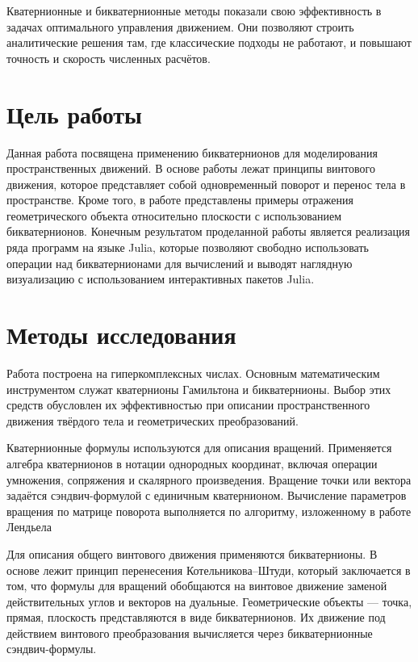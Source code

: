 Кватернионные и бикватернионные методы показали свою эффективность в задачах оптимального управления движением. Они позволяют строить аналитические решения там, где классические подходы не работают, и повышают точность и скорость численных расчётов.

\section*{Цель работы}

Данная работа посвящена применению бикватернионов для моделирования пространственных
движений. В основе работы лежат принципы винтового движения, которое представляет собой
одновременный поворот и перенос тела в пространстве. Кроме того, в работе представлены примеры
отражения геометрического объекта относительно плоскости с использованием бикватернионов.
Конечным результатом проделанной работы является реализация ряда программ на языке Julia, которые позволяют свободно использовать операции над бикватернионами для вычислений и выводят
наглядную визуализацию с использованием интерактивных пакетов Julia.

\section*{Методы исследования}

Работа построена на гиперкомплексных числах. Основным математическим инструментом служат кватернионы Гамильтона и бикватернионы. Выбор этих средств обусловлен их эффективностью при описании пространственного движения твёрдого тела и геометрических преобразований.

Кватернионные формулы используются для описания вращений. Применяется алгебра кватернионов в нотации однородных координат, включая операции умножения, сопряжения и скалярного произведения. Вращение точки или вектора задаётся сэндвич-формулой с единичным кватернионом. Вычисление параметров вращения по матрице поворота выполняется по алгоритму, изложенному в работе Лендьела ~\cite{Lengyel:2012}

Для описания общего винтового движения применяются бикватернионы. В основе лежит принцип перенесения Котельникова–Штуди, который заключается в том, что формулы для вращений обобщаются на винтовое движение заменой действительных углов и векторов на дуальные. Геометрические объекты --- точка, прямая, плоскость представляются в виде бикватернионов. Их движение под действием винтового преобразования вычисляется через бикватернионные сэндвич-формулы.

